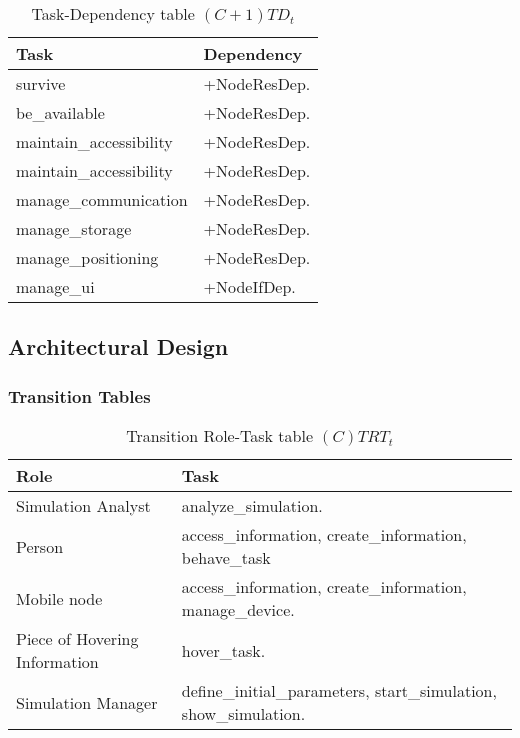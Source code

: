 \begin{table}[H]
	\centering
	\begin{tabular}{|p{5cm}|p{7cm}|}
			\hline
			\textbf{Task} & \textbf{Dependency} \\
			\hline
			survive & +NodeResDep. \\
			\hline
			be\_available & +NodeResDep. \\
			\hline
			maintain\_accessibility & +NodeResDep. \\
			\hline
			maintain\_accessibility & +NodeResDep. \\
			\hline
			manage\_communication & +NodeResDep. \\
			\hline
			manage\_storage & +NodeResDep. \\
			\hline
			manage\_positioning & +NodeResDep. \\
			\hline
			manage\_ui & +NodeIfDep. \\
			\hline
		\end{tabular}
	\caption{Task-Dependency table $(C+1)TD_t$}
	\label{tab:cp1tdt}
\end{table}

\subsection{Architectural Design}

\subsubsection{Transition Tables}

\begin{table}[H]
	\centering
	\begin{tabular}{|p{4cm}|p{8cm}|}
			\hline
			\textbf{Role} & \textbf{Task} \\
			\hline
			Simulation Analyst & analyze\_simulation.   \\
			\hline
			Person & access\_information, create\_information, behave\_task \\
			\hline
			Mobile node & access\_information, create\_information, manage\_device.
			\\
			\hline
			Piece of Hovering Information & hover\_task. \\
			\hline
			Simulation Manager & define\_initial\_parameters, start\_simulation, show\_simulation. \\
			\hline
		\end{tabular}
	\caption{Transition Role-Task table $(C)TRT_t$}
	\label{tab:ctrtt}
\end{table}

